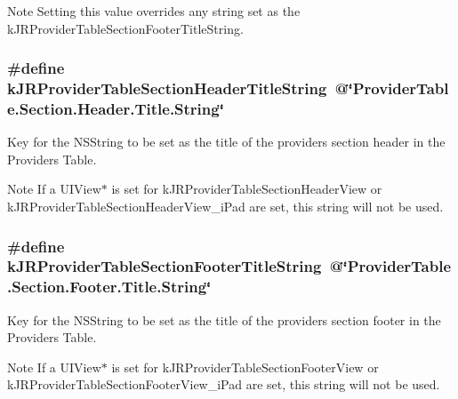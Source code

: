 \begin{DoxyNote}{Note}
Setting this value overrides any string set as the kJRProviderTableSectionFooterTitleString. 
\end{DoxyNote}
\hypertarget{group__custom_interface_ga667a6c955993ec24292875f319a7d763}{
\subsubsection[{kJRProviderTableSectionHeaderTitleString}]{\setlength{\rightskip}{0pt plus 5cm}\#define kJRProviderTableSectionHeaderTitleString~@\char`\"{}ProviderTable.Section.Header.Title.String\char`\"{}}}
\label{group__custom_interface_ga667a6c955993ec24292875f319a7d763}
Key for the {\ttfamily NSString} to be set as the title of the providers section header in the Providers Table.

\begin{DoxyNote}{Note}
If a UIView$\ast$ is set for kJRProviderTableSectionHeaderView or kJRProviderTableSectionHeaderView\_\-iPad are set, this string will not be used. 
\end{DoxyNote}
\hypertarget{group__custom_interface_ga72e63105251e7d4d6a363e279c2bf775}{
\subsubsection[{kJRProviderTableSectionFooterTitleString}]{\setlength{\rightskip}{0pt plus 5cm}\#define kJRProviderTableSectionFooterTitleString~@\char`\"{}ProviderTable.Section.Footer.Title.String\char`\"{}}}
\label{group__custom_interface_ga72e63105251e7d4d6a363e279c2bf775}
Key for the {\ttfamily NSString} to be set as the title of the providers section footer in the Providers Table.

\begin{DoxyNote}{Note}
If a UIView$\ast$ is set for kJRProviderTableSectionFooterView or kJRProviderTableSectionFooterView\_\-iPad are set, this string will not be used. 
\end{DoxyNote}

